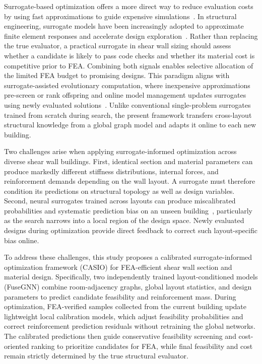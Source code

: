 Surrogate-based optimization offers a more direct way to reduce evaluation costs by using fast approximations to guide expensive simulations~\cite{Jones1998,Forrester2009}. In structural engineering, surrogate models have been increasingly adopted to approximate finite element responses and accelerate design exploration~\cite{Kudela2022,Samadian2024}. Rather than replacing the true evaluator, a practical surrogate in shear wall sizing should assess whether a candidate is likely to pass code checks and whether its material cost is competitive prior to FEA. Combining both signals enables selective allocation of the limited FEA budget to promising designs. This paradigm aligns with surrogate-assisted evolutionary computation, where inexpensive approximations pre-screen or rank offspring and online model management updates surrogates using newly evaluated solutions~\cite{Jin2002Framework,Jin2011SAEC}. Unlike conventional single-problem surrogates trained from scratch during search, the present framework transfers cross-layout structural knowledge from a global graph model and adapts it online to each new building.

Two challenges arise when applying surrogate-informed optimization across diverse shear wall buildings. First, identical section and material parameters can produce markedly different stiffness distributions, internal forces, and reinforcement demands depending on the wall layout. A surrogate must therefore condition its predictions on structural topology as well as design variables. Second, neural surrogates trained across layouts can produce miscalibrated probabilities and systematic prediction bias on an unseen building~\cite{Guo2017Calibration}, particularly as the search narrows into a local region of the design space. Newly evaluated designs during optimization provide direct feedback to correct such layout-specific bias online.

To address these challenges, this study proposes a calibrated surrogate-informed optimization framework (CASIO) for FEA-efficient shear wall section and material design. Specifically, two independently trained layout-conditioned models (FuseGNN) combine room-adjacency graphs, global layout statistics, and design parameters to predict candidate feasibility and reinforcement mass. During optimization, FEA-verified samples collected from the current building update lightweight local calibration models, which adjust feasibility probabilities and correct reinforcement prediction residuals without retraining the global networks. The calibrated predictions then guide conservative feasibility screening and cost-oriented ranking to prioritize candidates for FEA, while final feasibility and cost remain strictly determined by the true structural evaluator.

